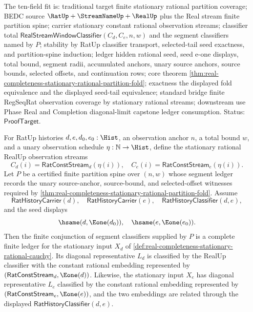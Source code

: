 The ten-field fit is: traditional target finite stationary rational partition
coverage; BEDC source $\RatUp+\StreamNameUp+\RealUp$ plus the Real stream
finite partition spine; carrier stationary constant rational observation
streams; classifier total
$\mathsf{RealStreamWindowClassifier}(C_d,C_e,n,w)$ and the segment classifiers
named by $P$; stability by RatUp classifier transport, selected-tail seed
exactness, and partition-spine induction; ledger hidden rational seed, seed
e-one displays, total bound, segment radii, accumulated anchors, unary source
anchors, source bounds, selected offsets, and continuation rows; core theorem
\autoref{thm:real-completeness-stationary-rational-partition-fold}; exactness
the displayed fold equivalence and the displayed seed-tail equivalence;
standard bridge finite RegSeqRat observation coverage by stationary rational
streams; downstream use Phase Real and Completion diagonal-limit capstone
ledger consumption. Status: $\mathsf{ProofTarget}$.

\begin{theorem}
\label{thm:real-completeness-stationary-partition-diagonal-embedding}
For RatUp histories $d,e,d_0,e_0:\Hist$, an observation anchor $n$, a total
bound $w$, and a unary observation schedule $\eta:\mathbb{N}\to\Hist$, define
the stationary rational RealUp observation streams
$$
C_d(i)=\mathsf{RatConstStream}_d(\eta(i)),
\quad
C_e(i)=\mathsf{RatConstStream}_e(\eta(i)).
$$
Let $P$ be a certified finite partition spine over $(n,w)$ whose segment ledger
records the unary source-anchor, source-bound, and selected-offset witnesses
required by
\autoref{thm:real-completeness-stationary-rational-partition-fold}. Assume
$$
\mathsf{RatHistoryCarrier}(d),\quad
\mathsf{RatHistoryCarrier}(e),\quad
\mathsf{RatHistoryClassifier}(d,e),
$$
and the seed displays
$$
\hsame(d,\Eone(d_0)),\quad
\hsame(e,\Eone(e_0)).
$$
Then the finite conjunction of segment classifiers supplied by $P$ is a
complete finite ledger for the stationary input $X_d$ of
\autoref{def:real-completeness-stationary-rational-cauchy}. Its diagonal
representative $L_d$ is classified by the RealUp classifier with the constant
rational embedding represented by $(\mathsf{RatConstStream}_d,\Eone(d))$.
Likewise, the stationary input $X_e$ has diagonal representative $L_e$
classified by the constant rational embedding represented by
$(\mathsf{RatConstStream}_e,\Eone(e))$, and the two embeddings are related
through the displayed $\mathsf{RatHistoryClassifier}(d,e)$.
\end{theorem}

